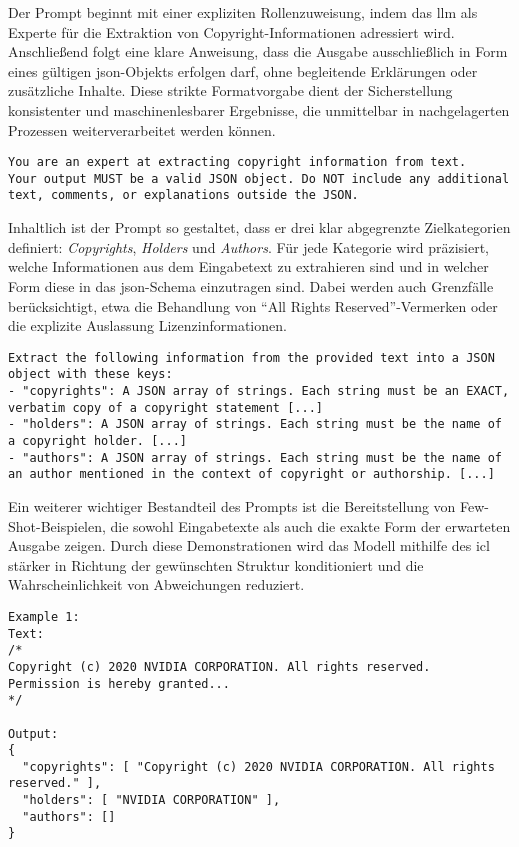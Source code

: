Der Prompt beginnt mit einer expliziten Rollenzuweisung, indem das \gls{llm} als Experte für die Extraktion von Copyright-Informationen adressiert wird.
Anschließend folgt eine klare Anweisung, dass die Ausgabe ausschließlich in Form eines gültigen \gls{json}-Objekts erfolgen darf, ohne begleitende Erklärungen oder zusätzliche Inhalte.
Diese strikte Formatvorgabe dient der Sicherstellung konsistenter und maschinenlesbarer Ergebnisse, die unmittelbar in nachgelagerten Prozessen weiterverarbeitet werden können.

\begin{lstlisting}[keepspaces=true]
You are an expert at extracting copyright information from text.
Your output MUST be a valid JSON object. Do NOT include any additional text, comments, or explanations outside the JSON.
\end{lstlisting}

Inhaltlich ist der Prompt so gestaltet, dass er drei klar abgegrenzte Zielkategorien definiert: \textit{Copyrights}, \textit{Holders} und \textit{Authors}.
Für jede Kategorie wird präzisiert, welche Informationen aus dem Eingabetext zu extrahieren sind und in welcher Form diese in das \gls{json}-Schema einzutragen sind.
Dabei werden auch Grenzfälle berücksichtigt, etwa die Behandlung von \enquote{All Rights Reserved}-Vermerken oder die explizite Auslassung Lizenzinformationen.

\begin{lstlisting}[keepspaces=true]
Extract the following information from the provided text into a JSON object with these keys:
- "copyrights": A JSON array of strings. Each string must be an EXACT, verbatim copy of a copyright statement [...]
- "holders": A JSON array of strings. Each string must be the name of a copyright holder. [...]
- "authors": A JSON array of strings. Each string must be the name of an author mentioned in the context of copyright or authorship. [...]
\end{lstlisting}

Ein weiterer wichtiger Bestandteil des Prompts ist die Bereitstellung von Few-Shot-Beispielen, die sowohl Eingabetexte als auch die exakte Form der erwarteten Ausgabe zeigen.
Durch diese Demonstrationen wird das Modell mithilfe des \gls{icl} stärker in Richtung der gewünschten Struktur konditioniert und die Wahrscheinlichkeit von Abweichungen reduziert.

\begin{lstlisting}[keepspaces=true]
Example 1:
Text:
/*
Copyright (c) 2020 NVIDIA CORPORATION. All rights reserved.
Permission is hereby granted...
*/

Output:
{
  "copyrights": [ "Copyright (c) 2020 NVIDIA CORPORATION. All rights reserved." ],
  "holders": [ "NVIDIA CORPORATION" ],
  "authors": []
}
\end{lstlisting}

